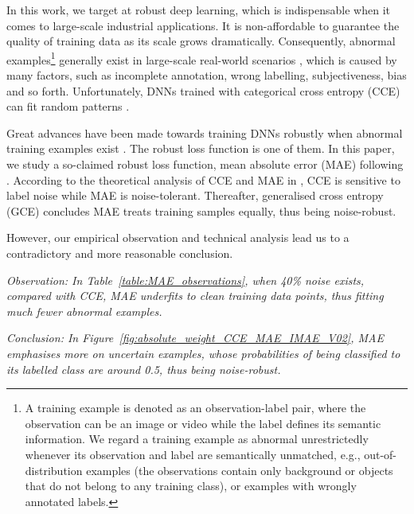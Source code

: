 \documentclass{article}
\begin{document}
In this work, we target at robust deep learning, which is indispensable when it comes to large-scale industrial applications. 
It is non-affordable to guarantee the quality of training data as its scale grows dramatically. Consequently, abnormal examples\footnote{A training example is denoted as an observation-label pair, where the observation can be an image or video while the label defines its semantic information. We regard a training example as abnormal unrestrictedly whenever its observation and label are semantically unmatched, e.g., out-of-distribution examples (the observations contain only background or objects that do not belong to any training class), or examples with wrongly annotated labels.} generally exist in large-scale real-world scenarios \cite{berrada2018smooth}, which is caused by many factors, such as incomplete annotation, wrong labelling, subjectiveness, bias and so forth. 
Unfortunately, DNNs trained with categorical cross entropy (CCE) can fit random patterns \cite{zhang2017understanding}.


















Great advances have been made towards training DNNs robustly when abnormal training examples exist \cite{arpit2017closer,chang2017active,ren2018learning,jiang2018mentornet}. The robust loss function is one of them. In this paper, we study a so-claimed robust loss function, mean absolute error (MAE) following \cite{ghosh2017robust, zhang2018generalized}. 
According to the theoretical analysis of CCE and MAE in \cite{ghosh2017robust}, CCE is sensitive to label noise while MAE is noise-tolerant. Thereafter, generalised cross entropy (GCE) \cite{zhang2018generalized} concludes MAE treats training samples equally, thus being noise-robust. 

However, our empirical observation and technical analysis lead us to a contradictory and more reasonable conclusion. 

\textit{Observation: In Table~\ref{table:MAE_observations}, when 40\% noise exists, compared with CCE, MAE underfits to clean training data points, thus fitting much fewer abnormal examples. }

\textit{Conclusion: In Figure~\ref{fig:absolute_weight_CCE_MAE_IMAE_V02}, MAE emphasises more on uncertain examples, whose probabilities of being classified to its labelled class are around 0.5, thus being noise-robust. }  
\end{document}
